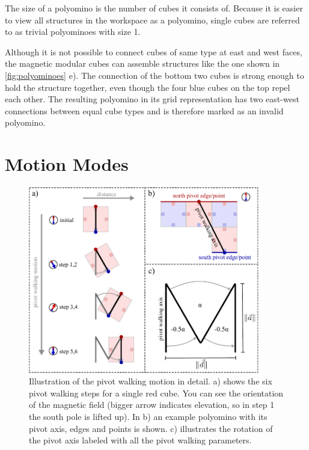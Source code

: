 The size of a polyomino is the number of cubes it consists of.
Because it is easier to view all structures in the workspace as a polyomino, single cubes are referred to as trivial polyominoes with size 1.

Although it is not possible to connect cubes of same type at east and west faces, the magnetic modular cubes can assemble structures like the one shown in \autoref{fig:polyominoes} e).
The connection of the bottom two cubes is strong enough to hold the structure together, even though the four blue cubes on the top repel each other.
The resulting polyomino in its grid representation has two east-west connections between equal cube types and is therefore marked as an invalid polyomino.



\section{Motion Modes}
\label{sec:motion}

\begin{figure}
	\centering
	\includegraphics[width=0.90\textwidth]{figures/pivot_walking.pdf}
	\caption[Illustration of the pivot walking motion]{Illustration of the pivot walking motion in detail. a) shows the six pivot walking steps for a single red cube. You can see the orientation of the magnetic field (bigger arrow indicates elevation, so in step 1 the south pole is lifted up). In b) an example polyomino with its pivot axis, edges and points is shown. c) illustrates the rotation of the pivot axis labeled with all the pivot walking parameters.}
	\label{fig:pivot_walking}
\end{figure}

